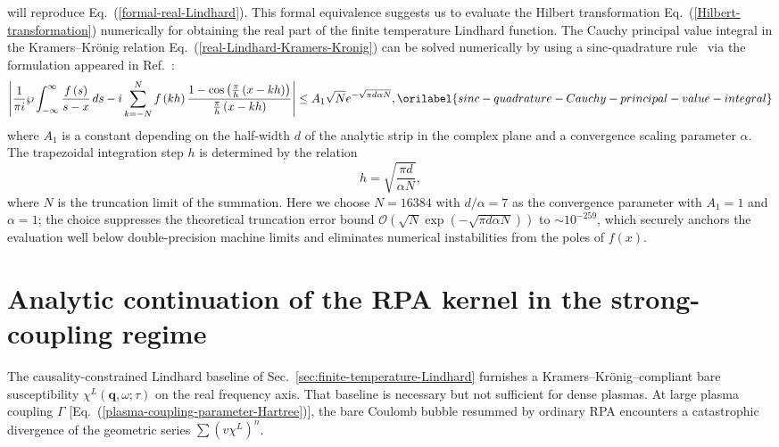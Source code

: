 \documentclass[aps,showkeys,noshowpacs,superscriptaddress,pre,preprint]{revtex4-2}
\let\label\orilabel
\begin{document}
will reproduce Eq.~(\ref{formal-real-Lindhard}).
This formal equivalence suggests us to evaluate the Hilbert transformation Eq.~(\ref{Hilbert-transformation})
numerically for obtaining the real part of the finite temperature Lindhard function.
The Cauchy principal value integral in the Kramers--Kr\"onig relation Eq.~(\ref{real-Lindhard-Kramers-Kronig}) can be solved numerically
by using a sinc-quadrature rule~\cite{Stanger1976} via the formulation appeared in Ref.~\cite{Davis-Rabinowitz1984}:
\begin{equation}
\left\vert
\frac{1}{\pi i} \wp \int_{-\infty}^{\infty} \frac{f\left( s \right)}{s - x}\, ds
- i \sum_{k = -N}^{N} f\left( k h \right)
\frac{1 - \cos\left( \frac{\pi}{h} \left( x - kh \right) \right)}{\frac{\pi}{h} \left( x - kh \right)}
\right\vert
\le
A_1 \sqrt{N} e^{- \sqrt{\pi d \alpha N}} ,
\label{sinc-quadrature-Cauchy-principal-value-integral}
\end{equation}
where $A_1$ is a constant depending on the half-width $d$ of the analytic strip in the complex plane and a convergence scaling parameter $\alpha$.
The trapezoidal integration step $h$ is determined by the relation
\begin{equation*}
h = \sqrt{\frac{\pi d}{\alpha N}} ,
\end{equation*}
where $N$ is the truncation limit of the summation.
Here we choose $N = 16384$ with $d/\alpha = 7$ as the convergence parameter with $A_1 = 1$ and $\alpha = 1$;
the choice suppresses the theoretical truncation error bound $\mathcal{O}(\sqrt{N} \exp(-\sqrt{\pi d \alpha N}))$ to $\sim 10^{-259}$, which securely anchors the evaluation well below double-precision machine limits and eliminates numerical instabilities from the poles of $f\left( x \right)$.

\section{Analytic continuation of the RPA kernel in the strong-coupling regime}
\label{sec:zeta-rpa}

The causality-constrained Lindhard baseline of Sec.~\ref{sec:finite-temperature-Lindhard} furnishes a Kramers--Kr\"onig--compliant bare susceptibility $\chi^L(\mathbf{q},\omega;\tau)$ on the real frequency axis. That baseline is necessary but not sufficient for dense plasmas. At large plasma coupling $\Gamma$ [Eq.~(\ref{plasma-coupling-parameter-Hartree})], the bare Coulomb bubble resummed by ordinary RPA encounters a catastrophic divergence of the geometric series $\sum (v\chi^L)^n$.
\end{document}
